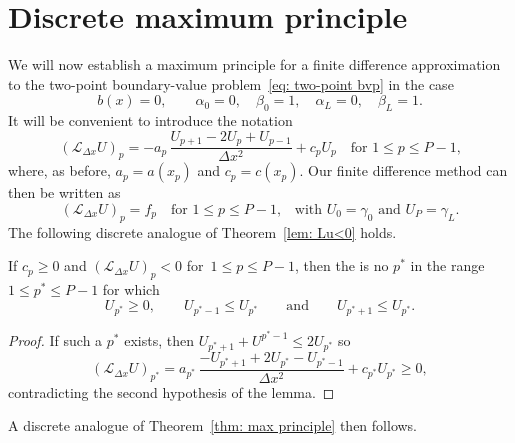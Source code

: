 \section{Discrete maximum principle}

We will now establish a maximum principle for a finite difference approximation 
to the two-point boundary-value problem~\eqref{eq: two-point bvp} in the case
\[
b(x)=0,\qquad\alpha_0=0,\quad\beta_0=1,\quad\alpha_L=0,\quad\beta_L=1.
\]
It will be convenient to introduce the notation
\[
(\mathcal{L}_{\Delta x}U)_p=-a_p\,\frac{U_{p+1}-2U_p+U_{p-1}}{\Delta x^2}
	+c_pU_p\quad\text{for $1\le p\le P-1$,}
\]
where, as before, $a_p=a(x_p)$ and $c_p=c(x_p)$. Our finite difference method 
can then be written as
\[
(\mathcal{L}_{\Delta x}U)_p=f_p\quad\text{for $1\le p\le P-1$,}\quad
	\text{with $U_0=\gamma_0$ and $U_P=\gamma_L$.}
\]
The following discrete analogue of Theorem~\ref{lem: Lu<0} holds.

\begin{lemma}\label{lem: discrete LU<0}
If $c_p\ge0$ and $(\mathcal{L}_{\Delta x}U)_p<0$ for~$1\le p\le P-1$, then
the is no $p^*$ in the range $1\le p^*\le P-1$ for which
\[
U_{p^*}\ge 0,\qquad U_{p^*-1}\le U_{p^*}\qquad\text{and}\qquad
U_{p^*+1}\le U_{p^*}.
\]
\end{lemma}
\begin{proof}
If such a $p^*$ exists, then $U_{p^*+1}+U^{p^*-1}\le 2U_{p^*}$ so
\[
(\mathcal{L}_{\Delta x}U)_{p^*}
	=a_{p^*}\,\frac{-U_{p^*+1}+2U_{p^*}-U_{p^*-1}}{\Delta x^2}
	+c_{p^*}U_{p^*}\ge 0,
\]
contradicting the second hypothesis of the lemma.
\end{proof}

A discrete analogue of Theorem~\ref{thm: max principle} then follows.

